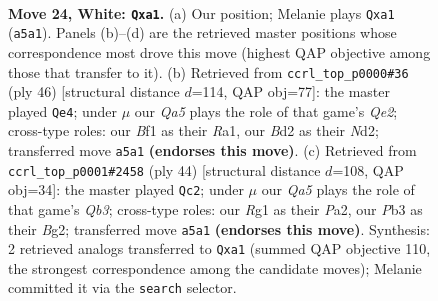 \documentclass[11pt]{article}
\begin{document}
\clearpage

\begin{figure}[p]\centering
\begin{subfigure}{0.46\textwidth}\centering
\resizebox{\linewidth}{!}{%
\newchessgame
\chessboard[
  setfen={r2rn1k1/p1p1qp2/6p1/Q1PpPb1p/3N4/1P2P1P1/3BRP1P/q2K1BR1 w - - 0 24},
  showmover=false,
  pgfstyle=straightmove, color=movearrow, markmove={a5-a1}
]}
\caption{}
\end{subfigure}\hfill
\begin{subfigure}{0.46\textwidth}\centering
\resizebox{\linewidth}{!}{%
\newchessgame
\chessboard[
  setfen={r3r1k1/p2n1pb1/1pq1p1p1/P6p/2PP3P/R1B3P1/3NQPK1/R7 w - - 1 24},
  showmover=false,
  pgfstyle=straightmove, color=movearrow, markmove={e2-e4}
]}
\caption{}
\end{subfigure}
\\[4pt]
\begin{subfigure}{0.46\textwidth}\centering
\resizebox{\linewidth}{!}{%
\newchessgame
\chessboard[
  setfen={r4rkb/p2bpp1p/1p4pP/n1p1P3/5BqN/1QP3P1/P4PB1/3RR1K1 w - - 6 23},
  showmover=false,
  pgfstyle=straightmove, color=movearrow, markmove={b3-c2}
]}
\caption{}
\end{subfigure}\hfill

\caption{\textbf{Move 24, White: \texttt{Qxa1}.} (a) Our position; Melanie plays \texttt{Qxa1} (\texttt{a5a1}). Panels (b)--(d) are the retrieved master positions whose correspondence most drove this move (highest QAP objective among those that transfer to it). (b) Retrieved from \texttt{ccrl\_top\_p0000\#36} (ply 46) [structural distance $d$=114, QAP obj=77]: the master played \texttt{Qe4}; under $\mu$ our \emph{Qa5} plays the role of that game's \emph{Qe2}; cross-type roles: our \emph{B}f1 as their \emph{R}a1, our \emph{B}d2 as their \emph{N}d2; transferred move \texttt{a5a1} \textbf{(endorses this move)}. (c) Retrieved from \texttt{ccrl\_top\_p0001\#2458} (ply 44) [structural distance $d$=108, QAP obj=34]: the master played \texttt{Qc2}; under $\mu$ our \emph{Qa5} plays the role of that game's \emph{Qb3}; cross-type roles: our \emph{R}g1 as their \emph{P}a2, our \emph{P}b3 as their \emph{B}g2; transferred move \texttt{a5a1} \textbf{(endorses this move)}. Synthesis: 2 retrieved analogs transferred to \texttt{Qxa1} (summed QAP objective 110, the strongest correspondence among the candidate moves); Melanie committed it via the \texttt{search} selector.}
\label{fig:thought-m46}
\end{figure}
\end{document}
